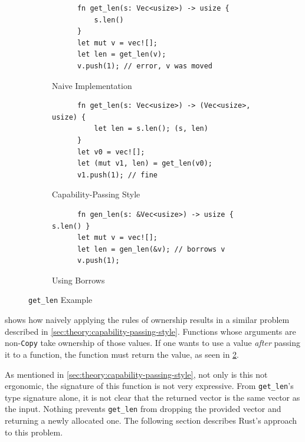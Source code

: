 \documentclass[sigplan,11pt,screen,nonacm]{acmart}
\newcommand*{\Copy}{\texttt{Copy}}
\begin{document}
\begin{figure}
  \begin{subfigure}{0.46\textwidth}
    \begin{verbatim}
      fn get_len(s: Vec<usize>) -> usize {
          s.len()
      }
      let mut v = vec![];
      let len = get_len(v);
      v.push(1); // error, v was moved
    \end{verbatim}
    \caption{Naive Implementation} \label{lst:get_len:naive}
  \end{subfigure}
  \begin{subfigure}{0.52\textwidth}
    \begin{verbatim}
      fn get_len(s: Vec<usize>) -> (Vec<usize>, usize) {
          let len = s.len(); (s, len)
      }
      let v0 = vec![];
      let (mut v1, len) = get_len(v0);
      v1.push(1); // fine
    \end{verbatim}
    \caption{Capability-Passing Style} \label{lst:get_len:capability-passing-style}
  \end{subfigure}

  \vspace{1em}

  \begin{subfigure}{0.5\textwidth}
    \begin{verbatim}
      fn gen_len(s: &Vec<usize>) -> usize { s.len() }
      let mut v = vec![];
      let len = gen_len(&v); // borrows v
      v.push(1);
    \end{verbatim}
    \caption{Using Borrows} \label{lst:get_len:borrows}
  \end{subfigure}
  \caption{\texttt{get_len} Example} \label{lst:get_len}
\end{figure}

 shows how naively applying the rules of ownership results in a similar problem described in \cref{sec:theory:capability-passing-style}. Functions whose arguments are non-\Copy{} take ownership of those values. If one wants to use a value \emph{after} passing it to a function, the function must return the value, as seen in \cref{lst:get_len:capability-passing-style}.

As mentioned in \cref{sec:theory:capability-passing-style}, not only is this not ergonomic, the signature of this function is not very expressive. From \texttt{get_len}'s type signature alone, it is not clear that the returned vector is the same vector as the input. Nothing prevents \texttt{get_len} from dropping the provided vector and returning a newly allocated one. The following section describes Rust's approach to this problem.
\end{document}
